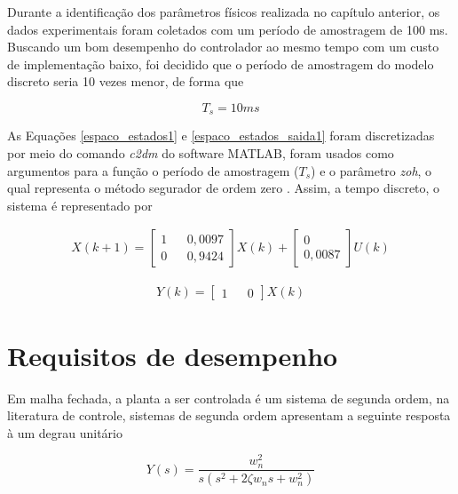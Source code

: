 Durante a identificação dos parâmetros físicos realizada no capítulo anterior, os dados experimentais foram coletados com um período de amostragem de 100 ms. Buscando um bom desempenho do controlador ao mesmo tempo com um custo de implementação baixo, foi decidido que o período de amostragem do modelo discreto seria 10 vezes menor, de forma que

\begin{equation}
    T_s = 10 ms
    \label{periodo_amostragem}
\end{equation}

As Equações \ref{espaco_estados1} e \ref{espaco_estados_saida1} foram discretizadas por meio do comando \textit{c2dm} do software MATLAB, foram usados como argumentos para a função o período de amostragem ($T_s$) e o parâmetro \textit{zoh}, o qual representa o método segurador de ordem zero \cite{franklin2013sistemas}. Assim, a tempo discreto, o sistema é representado por

\begin{gather}
    X(k+1)=
    \begin{bmatrix}
        1 && 0,0097 \\ 0 && 0,9424
    \end{bmatrix}
    X(k)
    +
    \begin{bmatrix}
        0 \\ 0,0087
    \end{bmatrix}
    U(k)
    \label{espaco_estados_d}
\end{gather}

\begin{gather}
    Y(k)=
    \begin{bmatrix}
        1 && 0
    \end{bmatrix}
    X(k)
    \label{espaco_estados_saida_d}
\end{gather}

\section{Requisitos de desempenho}

Em malha fechada, a planta a ser controlada é um sistema de segunda ordem, na literatura de controle, sistemas de segunda ordem apresentam a seguinte resposta à um degrau unitário

\begin{equation}
    Y(s)=\frac{w_n^2}{s(s^2+2\zeta w_n s+w_n^2)}
    \label{resposta_ordem2}
\end{equation}


